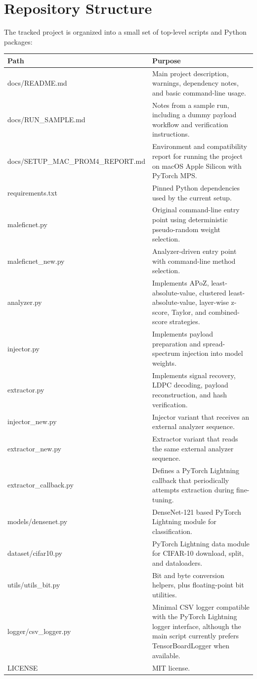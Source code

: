 \documentclass[11pt,a4paper]{article}
\begin{document}
\section{Repository Structure}

The tracked project is organized into a small set of top-level scripts and Python packages:

\begin{longtable}{>{\ttfamily}p{}p{}}
\textbf{Path} & \textbf{Purpose} \\
\hline
\endhead
docs/README.md & Main project description, warnings, dependency notes, and basic command-line usage. \\
docs/RUN\_SAMPLE.md & Notes from a sample run, including a dummy payload workflow and verification instructions. \\
docs/SETUP\_MAC\_PROM4\_REPORT.md & Environment and compatibility report for running the project on macOS Apple Silicon with PyTorch MPS. \\
requirements.txt & Pinned Python dependencies used by the current setup. \\
maleficnet.py & Original command-line entry point using deterministic pseudo-random weight selection. \\
maleficnet\_new.py & Analyzer-driven entry point with command-line method selection. \\
analyzer.py & Implements APoZ, least-absolute-value, clustered least-absolute-value, layer-wise z-score, Taylor, and combined-score strategies. \\
injector.py & Implements payload preparation and spread-spectrum injection into model weights. \\
extractor.py & Implements signal recovery, LDPC decoding, payload reconstruction, and hash verification. \\
injector\_new.py & Injector variant that receives an external analyzer sequence. \\
extractor\_new.py & Extractor variant that reads the same external analyzer sequence. \\
extractor\_callback.py & Defines a PyTorch Lightning callback that periodically attempts extraction during fine-tuning. \\
models/densenet.py & DenseNet-121 based PyTorch Lightning module for classification. \\
dataset/cifar10.py & PyTorch Lightning data module for CIFAR-10 download, split, and dataloaders. \\
utils/utils\_bit.py & Bit and byte conversion helpers, plus floating-point bit utilities. \\
logger/csv\_logger.py & Minimal CSV logger compatible with the PyTorch Lightning logger interface, although the main script currently prefers TensorBoardLogger when available. \\
LICENSE & MIT license. \\
\end{longtable}
\end{document}
